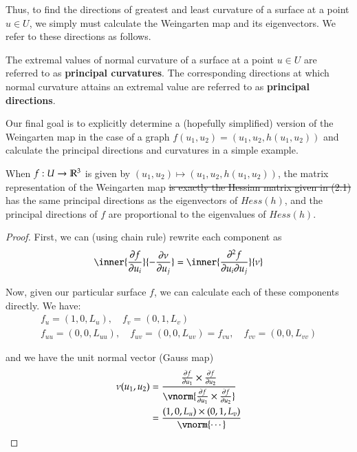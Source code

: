         	Thus, to find the directions of greatest and least curvature of a surface at a point $u \in U$, we simply must calculate the Weingarten map and its eigenvectors. We refer to these directions as follows.
        	
        	\begin{defn}
        		The extremal values of normal curvature of a surface at a point  $u\in U$
        		are referred to as \textbf{principal curvatures}. The corresponding directions at which normal curvature attains an extremal value are referred to as \textbf{principal directions}.
        	\end{defn}
        	
        	Our final goal is to explicitly determine a (hopefully simplified) version of the Weingarten map in the case of a graph $f(u_1,u_2) = (u_1,u_2, h(u_1,u_2))$ and calculate
        	the principal directions and curvatures in a simple example.
        	        		
        	\begin{theorem}
	        	When $f: U \to \mathbb{R}^3$ is given by $(u_1,u_2) \mapsto (u_1,u_2,h(u_1,u_2))$, the matrix
	        	representation of the Weingarten map \sout{is exactly the Hessian matrix given in (2.1)} has the same principal directions as the eigenvectors of $Hess(h)$, and the principal directions of $f$ are proportional to the eigenvalues of $Hess(h)$.
        	\end{theorem}
        	\begin{proof}
        		First, we can (using chain rule) rewrite each component as
        		\[ \inner{\frac{\partial f}{\partial u_i}}{-\frac{\partial \nu}{\partial u_j}}
        		= \inner{\frac{\partial^2 f}{\partial u_i \partial u_j}}{\nu} \]
        		
        		Now, given our particular surface $f$, we can calculate each of these components directly. We have:
        		\begin{equation}
        		\begin{gathered}
        		f_{u} = (1, 0, L_u) , \quad
        		f_{v} = (0, 1, L_v)  \\
        		f_{uu} = (0, 0, L_{uu}) , \quad
        		f_{uv} = (0, 0, L_{uv}) = f_{vu} , \quad
        		f_{vv} = (0, 0, L_{vv})
        		\end{gathered}
        		\end{equation}
        		
        		and we have the unit normal vector (Gauss map)
        		\begin{align}
        		\nu(u_1, u_2) &=
        		\frac{\frac{\partial f}{\partial u_1} \times \frac{\partial f}{\partial u_2}}
        		{\vnorm{\frac{\partial f}{\partial u_1} \times \frac{\partial f}{\partial u_2}}} \\
        		&= \frac{(1, 0, L_u) \times (0, 1, L_v)}{\vnorm{\cdots}}
			 \end{align}    		
        		
        	\end{proof}
